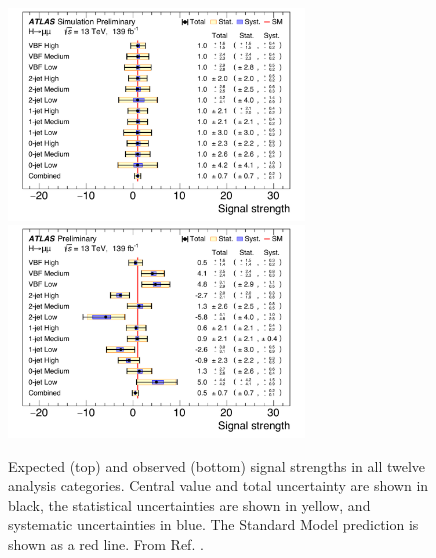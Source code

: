 \begin{figure}[h!]
  \centering
  \includegraphics[width=0.7\textwidth]{figures/hmumu/STXS_exp}
  \includegraphics[width=0.7\textwidth]{figures/hmumu/STXS_obser}
  \caption[Expected and observed signal strengths in analysis categories]{
  Expected (top) and observed (bottom) signal strengths in all twelve
  analysis categories. Central value and total uncertainty are shown 
  in black, the statistical uncertainties are shown in yellow, and
  systematic uncertainties in blue. The Standard Model prediction
  is shown as a red line.
  From Ref. \cite{ATLAS-CONF-2019-028}.
  }
  \label{fig:hmumu:fit-pulls}
\end{figure}






